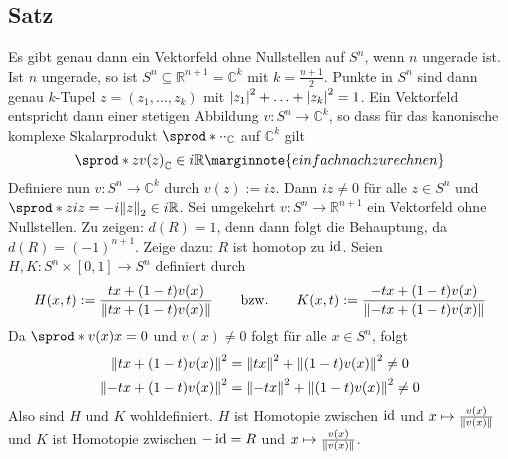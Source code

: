 \subsection[Satz: Es gibt ein Vektorfeld ohne Nullstellen auf $S^n \iff n$ ist ungerade]{Satz} %
\label{sub:108}
Es gibt genau dann ein Vektorfeld ohne Nullstellen auf $S^n$, wenn $n$ ungerade ist.
Ist $n$ ungerade, so ist $S^{n} \subseteq \mathds{R}^{n+1} = \mathds{C}^{k}$ mit $k=\frac{n+1}{2}$. Punkte in $S^n$ sind dann genau $k$-Tupel $z=(z_1, \ldots , z_k)$ mit
$\abs*{z_1}^2 + \ldots + \abs*{z_k}^2 = 1$. Ein Vektorfeld entspricht dann einer stetigen Abbildung $v \colon S^n \to \mathds{C}^k$, so dass für das kanonische komplexe 
Skalarprodukt $\sprod*{\cdot }{\cdot}_\mathds{C} $ auf $\mathds{C}^k$ gilt
\[
	\sprod*{z}{v(z)}_\mathds{C} \in i \mathds{R} \marginnote{einfach nachzurechnen}
\]
Definiere nun $v \colon S^n \to \mathds{C}^k$ durch $v(z) := i z$. Dann $i z\not= 0$ für alle $z \in S^n$ und $\sprod*{z}{i z}= -i \norm[2]{z} \in i \mathds{R}$. Sei 
umgekehrt $v \colon S^n \to \mathds{R}^{n+1}$ ein Vektorfeld ohne Nullstellen. Zu zeigen: $d(R)=1$, denn dann folgt die Behauptung, da $d(R)=(-1)^{n+1}$.
Zeige dazu: $R$ ist homotop zu $\id$. Seien $H, K \colon S^n \times [0,1] \to S^n$ definiert durch 
\[
	H(x,t) := \frac{t x + (1-t)v(x)}{\norm{tx + (1-t)v(x)} } \qquad \text{bzw.}\qquad K(x,t) :=  \frac{-t x + (1-t)v(x)}{\norm{-tx + (1-t)v(x)}}
\]
Da $\sprod*{v(x)}{x}=0$  und $v(x)\not=0$ folgt für alle $x \in S^n$, folgt
\begin{align*}
	\norm{t x + (1-t)v(x)}^2 &= \norm{tx}^2 + \norm{(1-t)v(x)}^2 \not=0   \\
	\norm{-t x + (1-t)v(x)}^2 &= \norm{-tx}^2 + \norm{(1-t)v(x)}^2 \not=0
\end{align*}
Also sind $H$ und $K$ wohldefiniert. $H$ ist Homotopie zwischen $\id$ und $x \mapsto \frac{v(x)}{\norm{v(x)} } $ und $K$ ist Homotopie zwischen $-\id=R$ und 
$x \mapsto \frac{v(x)}{\norm{v(x)} } $. \bewende

